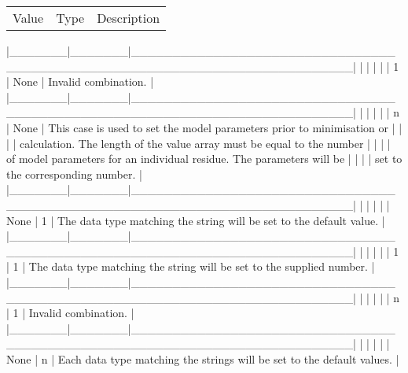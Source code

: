 \begin{tabular}{ccc}
Value & Type & Description \\
\end{tabular}
|\_\_\_\_\_\_\_|\_\_\_\_\_\_\_|\_\_\_\_\_\_\_\_\_\_\_\_\_\_\_\_\_\_\_\_\_\_\_\_\_\_\_\_\_\_\_\_\_\_\_\_\_\_\_\_\_\_\_\_\_\_\_\_\_\_\_\_\_\_\_\_\_\_\_\_\_\_\_\_\_\_\_\_\_\_\_\_\_\_|
|       |       |                                                                          |
|   1   | None  | Invalid combination.                                                     |
|\_\_\_\_\_\_\_|\_\_\_\_\_\_\_|\_\_\_\_\_\_\_\_\_\_\_\_\_\_\_\_\_\_\_\_\_\_\_\_\_\_\_\_\_\_\_\_\_\_\_\_\_\_\_\_\_\_\_\_\_\_\_\_\_\_\_\_\_\_\_\_\_\_\_\_\_\_\_\_\_\_\_\_\_\_\_\_\_\_|
|       |       |                                                                          |
|   n   | None  | This case is used to set the model parameters prior to minimisation or   |
|       |       | calculation.  The length of the value array must be equal to the number  |
|       |       | of model parameters for an individual residue.  The parameters will be   |
|       |       | set to the corresponding number.                                         |
|\_\_\_\_\_\_\_|\_\_\_\_\_\_\_|\_\_\_\_\_\_\_\_\_\_\_\_\_\_\_\_\_\_\_\_\_\_\_\_\_\_\_\_\_\_\_\_\_\_\_\_\_\_\_\_\_\_\_\_\_\_\_\_\_\_\_\_\_\_\_\_\_\_\_\_\_\_\_\_\_\_\_\_\_\_\_\_\_\_|
|       |       |                                                                          |
| None  |   1   | The data type matching the string will be set to the default value.      |
|\_\_\_\_\_\_\_|\_\_\_\_\_\_\_|\_\_\_\_\_\_\_\_\_\_\_\_\_\_\_\_\_\_\_\_\_\_\_\_\_\_\_\_\_\_\_\_\_\_\_\_\_\_\_\_\_\_\_\_\_\_\_\_\_\_\_\_\_\_\_\_\_\_\_\_\_\_\_\_\_\_\_\_\_\_\_\_\_\_|
|       |       |                                                                          |
|   1   |   1   | The data type matching the string will be set to the supplied number.    |
|\_\_\_\_\_\_\_|\_\_\_\_\_\_\_|\_\_\_\_\_\_\_\_\_\_\_\_\_\_\_\_\_\_\_\_\_\_\_\_\_\_\_\_\_\_\_\_\_\_\_\_\_\_\_\_\_\_\_\_\_\_\_\_\_\_\_\_\_\_\_\_\_\_\_\_\_\_\_\_\_\_\_\_\_\_\_\_\_\_|
|       |       |                                                                          |
|   n   |   1   | Invalid combination.                                                     |
|\_\_\_\_\_\_\_|\_\_\_\_\_\_\_|\_\_\_\_\_\_\_\_\_\_\_\_\_\_\_\_\_\_\_\_\_\_\_\_\_\_\_\_\_\_\_\_\_\_\_\_\_\_\_\_\_\_\_\_\_\_\_\_\_\_\_\_\_\_\_\_\_\_\_\_\_\_\_\_\_\_\_\_\_\_\_\_\_\_|
|       |       |                                                                          |
| None  |   n   | Each data type matching the strings will be set to the default values.   |
